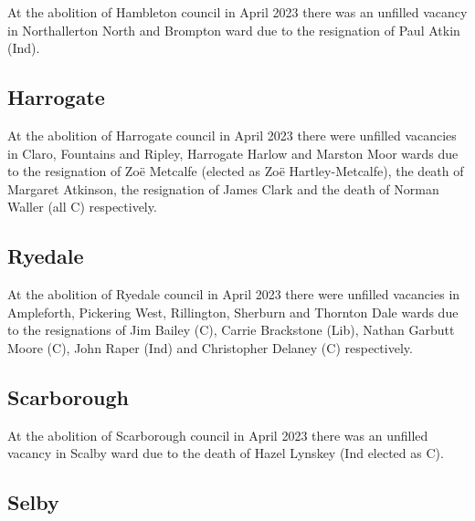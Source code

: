 \documentclass[a4paper,openany]{book}
\begin{document}
\begin{resultsiii}
At the abolition of Hambleton council in April 2023 there was an unfilled vacancy in Northallerton North and Brompton ward due to the resignation of Paul Atkin (Ind).

\subsection*{Harrogate}

At the abolition of Harrogate council in April 2023 there were unfilled vacancies in Claro, Fountains and Ripley, Harrogate Harlow and Marston Moor wards due to the resignation of Zoë Metcalfe (elected as Zoë Hartley-Metcalfe), the death of Margaret Atkinson, the resignation of James Clark and the death of Norman Waller (all C) respectively.%
%
%
%

\subsection*{Ryedale}

At the abolition of Ryedale council in April 2023 there were unfilled vacancies in Ampleforth, Pickering West, Rillington, Sherburn and Thornton Dale wards due to the resignations of Jim Bailey (C), Carrie Brackstone (Lib), Nathan Garbutt Moore (C), John Raper (Ind) and Christopher Delaney (C) respectively.%
%
%
%
%

\subsection*{Scarborough}

At the abolition of Scarborough council in April 2023 there was an unfilled vacancy in Scalby ward due to the death of Hazel Lynskey (Ind elected as C).%

\subsection*{Selby}


\end{resultsiii}
\end{document}
